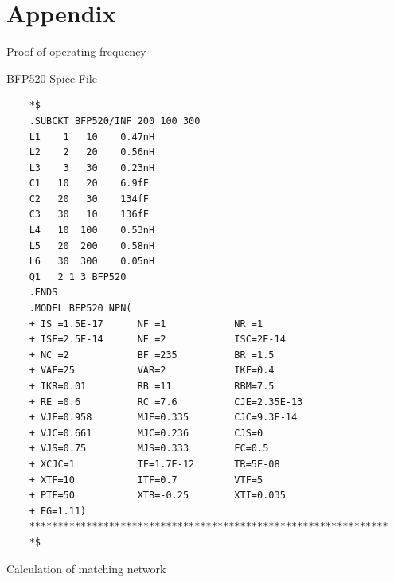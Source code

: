 \documentclass{beamer}
\begin{document}
\section*{Appendix}


\begin{frame}{Proof of operating frequency}

\end{frame}

\begin{frame}[fragile]{BFP520 Spice File}
\begin{tiny}
  \begin{lstlisting}
    *$
    .SUBCKT BFP520/INF 200 100 300
    L1    1   10    0.47nH
    L2    2   20    0.56nH
    L3    3   30    0.23nH
    C1   10   20    6.9fF
    C2   20   30    134fF
    C3   30   10    136fF
    L4   10  100    0.53nH
    L5   20  200    0.58nH
    L6   30  300    0.05nH
    Q1   2 1 3 BFP520
    .ENDS
    .MODEL BFP520 NPN(
    + IS =1.5E-17      NF =1            NR =1
    + ISE=2.5E-14      NE =2            ISC=2E-14
    + NC =2            BF =235          BR =1.5
    + VAF=25           VAR=2            IKF=0.4
    + IKR=0.01         RB =11           RBM=7.5
    + RE =0.6          RC =7.6          CJE=2.35E-13
    + VJE=0.958        MJE=0.335        CJC=9.3E-14
    + VJC=0.661        MJC=0.236        CJS=0
    + VJS=0.75         MJS=0.333        FC=0.5
    + XCJC=1           TF=1.7E-12       TR=5E-08
    + XTF=10           ITF=0.7          VTF=5
    + PTF=50           XTB=-0.25        XTI=0.035
    + EG=1.11)
    ***************************************************************
    *$
  \end{lstlisting}
\end{tiny}

\end{frame}

\begin{frame}{Calculation of matching network}

\end{frame}
\end{document}
